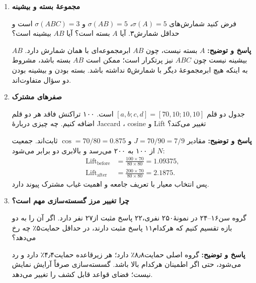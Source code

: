 \documentclass[12pt,a4paper,oneside]{report}
\newcounter{ex}[chapter]
\newenvironment{selftests}{\begin{enumerate}\setlength{\itemsep}{9pt}}{\end{enumerate}}
\newenvironment{selftest}[1]{\item\textbf{#1}\par}{\par}
\newcommand{\answer}[1]{\par{\color{teal}\bfseries پاسخ و توضیح: }#1\par}
\begin{document}
\begin{selftests}
\begin{selftest}{مجموعهٔ بسته و بیشینه}
فرض کنید شمارش‌های $\sigma(A)=5$، $\sigma(AB)=5$ و $\sigma(ABC)=3$ است و حداقل شمارش۳. آیا $A$ بسته است؟ آیا $AB$ بیشینه است؟
\answer{$A$ بسته نیست، چون $AB$ ابرمجموعه‌ای با همان شمارش دارد. $AB$ بیشینه نیست چون $ABC$ نیز پرتکرار است؛ ممکن است $AB$ بسته باشد، مشروط به اینکه هیچ ابرمجموعهٔ دیگر با شمارش۵ نداشته باشد. بسته بودن و بیشینه بودن دو سؤال متفاوت‌اند.}
\end{selftest}

\begin{selftest}{صفرهای مشترک}
جدول دو قلم $[a,b;c,d]=[70,10;10,10]$ است. ۱۰۰ تراکنش فاقد هر دو قلم اضافه کنیم. چه چیزی دربارهٔ Jaccard ، cosine و Lift تغییر می‌کند؟
\answer{مقادیر $J=70/90=7/9$ و $\operatorname{cos}=70/80=0.875$ ثابت‌اند. جمعیت $N$ از ۱۰۰ به ۲۰۰ می‌رسد و بالابری دو برابر می‌شود:
\begin{align*}
\operatorname{Lift}_{\mathrm{before}}&=\frac{100\times70}{80\times80}=1.09375,\\
\operatorname{Lift}_{\mathrm{after}}&=\frac{200\times70}{80\times80}=2.1875.
\end{align*}
پس انتخاب معیار با تعریف جامعه و اهمیت غیاب مشترک پیوند دارد.}
\end{selftest}

\begin{selftest}{چرا تغییر مرز گسسته‌سازی مهم است؟}
گروه سن۱۶--۲۴ در نمونهٔ۲۵۰ نفری،۲۲ پاسخ مثبت از۲۷ نفر دارد. اگر آن را به دو بازه تقسیم کنیم که هرکدام۱۱ پاسخ مثبت دارند، در حداقل حمایت۵٪ چه رخ می‌دهد؟
\answer{گروه اصلی حمایت۸٫۸٪ دارد؛ هر زیرقاعده حمایت۴٫۴٪ دارد و رد می‌شود، حتی اگر اطمینان هرکدام بالا باشد. گسسته‌سازی صرفاً آرایش نمایش نیست؛ فضای قواعد قابل کشف را تغییر می‌دهد.}
\end{selftest}
\end{selftests}
\end{document}
